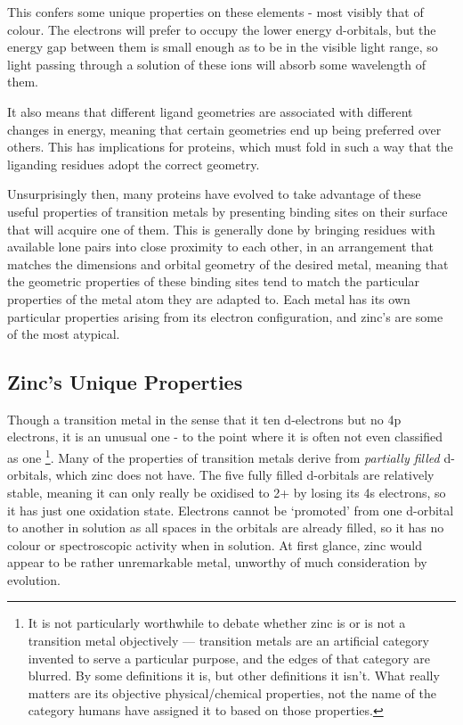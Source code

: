 This confers some unique properties on these elements - most visibly that of colour. The electrons will prefer to occupy the lower energy d-orbitals, but the energy gap between them is small enough as to be in the visible light range, so light passing through a solution of these ions will absorb some wavelength of them.

It also means that different ligand geometries are associated with different changes in energy, meaning that certain geometries end up being preferred over others. This has implications for proteins, which must fold in such a way that the liganding residues adopt the correct geometry.

Unsurprisingly then, many proteins have evolved to take advantage of these useful properties of transition metals by presenting binding sites on their surface that will acquire one of them. This is generally done by bringing residues with available lone pairs into close proximity to each other, in an arrangement that matches the dimensions and orbital geometry of the desired metal, meaning that the geometric properties of these binding sites tend to match the particular properties of the metal atom they are adapted to. Each metal has its own particular properties arising from its electron configuration, and zinc's are some of the most atypical.

\subsection{Zinc's Unique Properties}

Though a transition metal in the sense that it ten d-electrons but no 4p electrons, it is an unusual one - to the point where it is often not even classified as one \footnote{It is not particularly worthwhile to debate whether zinc is or is not a transition metal objectively --- transition metals are an artificial category invented to serve a particular purpose, and the edges of that category are blurred. By some definitions it is, but other definitions it isn't. What really matters are its objective physical/chemical properties, not the name of the category humans have assigned it to based on those properties.}. Many of the properties of transition metals derive from \emph{partially filled} d-orbitals, which zinc does not have. The five fully filled d-orbitals are relatively stable, meaning it can only really be oxidised to 2+ by losing its 4s electrons, so it has just one oxidation state. Electrons cannot be `promoted' from one d-orbital to another in solution as all spaces in the orbitals are already filled, so it has no colour or spectroscopic activity when in solution. At first glance, zinc would appear to be rather unremarkable metal, unworthy of much consideration by evolution.

